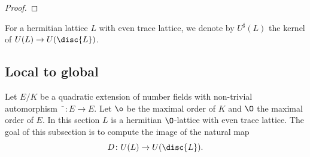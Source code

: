 \begin{proof}
%
%
\end{proof}

For a hermitian lattice $L$ with even trace lattice, we denote by $U^\sharp(L)$ the kernel of $U(L) \to U(\disc{L})$.

\subsection{Local to global}
Let $E/K$ be a quadratic extension of number fields with non-trivial automorphism $\bar{\phantom{x}} \colon E \to E$.
Let $\o$ be the maximal order of $K$ and $\O$ the maximal order of $E$.
In this section $L$ is a hermitian $\O$-lattice with even trace lattice.
The goal of this subsection is to compute
the image of the natural map
\[D\colon U(L) \rightarrow U(\disc{L}).\]

